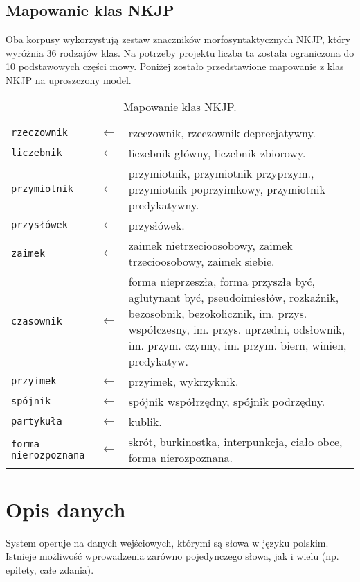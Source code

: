 	\subsection{Mapowanie klas NKJP}
Oba korpusy wykorzystują zestaw znaczników morfosyntaktycznych NKJP, który wyróżnia 36 rodzajów klas.
Na potrzeby projektu liczba ta została ograniczona do 10 podstawowych części mowy. Poniżej zostało przedstawione mapowanie z klas NKJP na uproszczony model.
\begin{table}[H]
	\centering
	\caption{Mapowanie klas NKJP.}
	\begin{tabular}{p{3cm}p{.5cm}p{11cm}}
		\toprule
		\texttt{rzeczownik} & $\leftarrow$ & rzeczownik, rzeczownik deprecjatywny. \\
		\texttt{liczebnik} & $\leftarrow$ & liczebnik główny, liczebnik zbiorowy. \\
		\texttt{przymiotnik} & $\leftarrow$ & przymiotnik, przymiotnik przyprzym., przymiotnik poprzyimkowy, przymiotnik predykatywny. \\
		\texttt{przysłówek} & $\leftarrow$ & przysłówek. \\
		\texttt{zaimek} & $\leftarrow$ & zaimek nietrzecioosobowy, zaimek trzecioosobowy, zaimek siebie. \\
		\texttt{czasownik} & $\leftarrow$ & forma nieprzeszła, forma przyszła być, aglutynant być, pseudoimiesłów, rozkaźnik, bezosobnik, bezokolicznik, im. przys. współczesny, im. przys. uprzedni, odsłownik, im. przym. czynny, im. przym. biern, winien, predykatyw. \\
		\texttt{przyimek} & $\leftarrow$ & przyimek, wykrzyknik. \\
		\texttt{spójnik} & $\leftarrow$ & spójnik współrzędny, spójnik podrzędny. \\
		\texttt{partykuła} & $\leftarrow$ & kublik. \\
		\texttt{forma nierozpoznana} & $\leftarrow$ & skrót, burkinostka, interpunkcja, ciało obce, forma nierozpoznana. \\
		\bottomrule
	\end{tabular}
\end{table}

\section{Opis danych}
	System operuje na danych wejściowych, którymi są słowa w języku polskim.
	Istnieje możliwość wprowadzenia zarówno pojedynczego słowa, jak i wielu (np. epitety, całe zdania).
	
